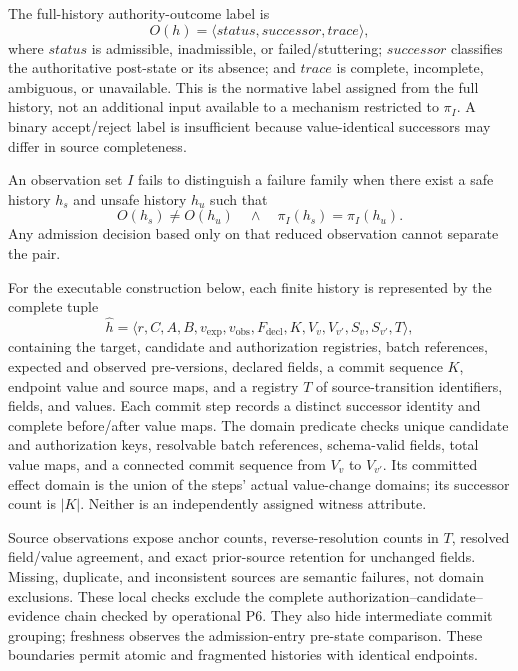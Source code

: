 The full-history authority-outcome label is
\begin{equation}
O(h)=\langle status,successor,trace\rangle,
\label{eq:outcome}
\end{equation}
where $status$ is admissible, inadmissible, or failed/stuttering; $successor$ classifies the authoritative post-state or its absence; and $trace$ is complete, incomplete, ambiguous, or unavailable. This is the normative label assigned from the full history, not an additional input available to a mechanism restricted to $\pi_I$. A binary accept/reject label is insufficient because value-identical successors may differ in source completeness.

An observation set $I$ fails to distinguish a failure family when there exist a safe history $h_s$ and unsafe history $h_u$ such that
\begin{equation}
O(h_s)\neq O(h_u)
\quad\land\quad
\pi_I(h_s)=\pi_I(h_u).
\label{eq:indistinguishable}
\end{equation}
Any admission decision based only on that reduced observation cannot separate the pair.

For the executable construction below, each finite history is represented by the complete tuple
\begin{equation}
\widehat h=\langle r,C,A,B,v_{\mathrm{exp}},v_{\mathrm{obs}},
F_{\mathrm{decl}},K,V_v,V_{v'},S_v,S_{v'},T\rangle,
\label{eq:witness-history}
\end{equation}
containing the target, candidate and authorization registries, batch references, expected and observed pre-versions, declared fields, a commit sequence $K$, endpoint value and source maps, and a registry $T$ of source-transition identifiers, fields, and values. Each commit step records a distinct successor identity and complete before/after value maps. The domain predicate checks unique candidate and authorization keys, resolvable batch references, schema-valid fields, total value maps, and a connected commit sequence from $V_v$ to $V_{v'}$. Its committed effect domain is the union of the steps' actual value-change domains; its successor count is $|K|$. Neither is an independently assigned witness attribute.

Source observations expose anchor counts, reverse-resolution counts in $T$, resolved field/value agreement, and exact prior-source retention for unchanged fields. Missing, duplicate, and inconsistent sources are semantic failures, not domain exclusions. These local checks exclude the complete authorization--candidate--evidence chain checked by operational P6. They also hide intermediate commit grouping; freshness observes the admission-entry pre-state comparison. These boundaries permit atomic and fragmented histories with identical endpoints.

